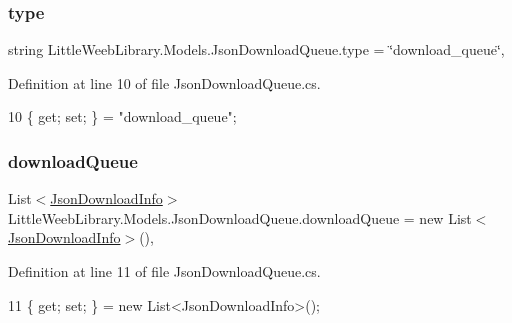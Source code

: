 \subsubsection{\texorpdfstring{type}{type}}
{\footnotesize\ttfamily string Little\+Weeb\+Library.\+Models.\+Json\+Download\+Queue.\+type = \char`\"{}download\+\_\+queue\char`\"{}\hspace{0.3cm}{\ttfamily [get]}, {\ttfamily [set]}}



Definition at line 10 of file Json\+Download\+Queue.\+cs.


\begin{DoxyCode}
10 \{ \textcolor{keyword}{get}; \textcolor{keyword}{set}; \} = \textcolor{stringliteral}{"download\_queue"};
\end{DoxyCode}
\mbox{\label{class_little_weeb_library_1_1_models_1_1_json_download_queue_adedf9349c2afaa8562acc771e4fe5829}} 
\subsubsection{\texorpdfstring{download\+Queue}{downloadQueue}}
{\footnotesize\ttfamily List$<$\mbox{\hyperlink{class_little_weeb_library_1_1_models_1_1_json_download_info}{Json\+Download\+Info}}$>$ Little\+Weeb\+Library.\+Models.\+Json\+Download\+Queue.\+download\+Queue = new List$<$\mbox{\hyperlink{class_little_weeb_library_1_1_models_1_1_json_download_info}{Json\+Download\+Info}}$>$()\hspace{0.3cm}{\ttfamily [get]}, {\ttfamily [set]}}



Definition at line 11 of file Json\+Download\+Queue.\+cs.


\begin{DoxyCode}
11 \{ \textcolor{keyword}{get}; \textcolor{keyword}{set}; \} = \textcolor{keyword}{new} List<JsonDownloadInfo>();
\end{DoxyCode}
\mbox{\label{class_little_weeb_library_1_1_models_1_1_json_download_queue_a3c74cd3356056030ff71af3892d10b03}} 
